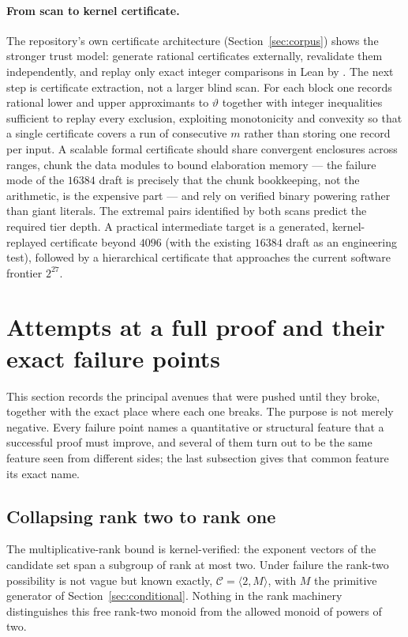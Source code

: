 \documentclass[11pt,oneside]{article}
\theoremstyle{definition}
\theoremstyle{remark}
\newcommand{\thetaq}{\vartheta}
\newcommand{\Cand}{\mathcal C}
\newcommand{\lean}[1]{\texttt{\detokenize{#1}}}
\begin{document}
\paragraph{From scan to kernel certificate.}
The repository's own certificate architecture (Section~\ref{sec:corpus}) shows the stronger
trust model: generate rational certificates externally, revalidate them independently, and
replay only exact integer comparisons in Lean by \lean{decide}.  The next step is certificate
extraction, not a larger blind scan.  For each block one records rational lower and upper
approximants to $\thetaq$ together with integer inequalities sufficient to replay every
exclusion, exploiting monotonicity and convexity so that a single certificate covers a run of
consecutive $m$ rather than storing one record per input.  A scalable formal certificate
should share convergent enclosures across ranges, chunk the data modules to bound elaboration
memory --- the failure mode of the $16384$ draft is precisely that the chunk bookkeeping, not
the arithmetic, is the expensive part --- and rely on verified binary powering rather than
giant literals.  The extremal pairs identified by both scans predict the required tier depth.
A practical intermediate target is a generated, kernel-replayed certificate beyond $4096$
(with the existing $16384$ draft as an engineering test), followed by a hierarchical
certificate that approaches the current software frontier $2^{27}$.
\section{Attempts at a full proof and their exact failure points}
\label{sec:attempts}

This section records the principal avenues that were pushed until they broke, together with
the exact place where each one breaks.  The purpose is not merely negative.  Every failure
point names a quantitative or structural feature that a successful proof must improve, and
several of them turn out to be the same feature seen from different sides; the last
subsection gives that common feature its exact name.

\subsection{Collapsing rank two to rank one}
\label{at:rank}

The multiplicative-rank bound is kernel-verified: the exponent vectors of the candidate set
span a subgroup of rank at most two.  Under failure the rank-two possibility is not vague
but known exactly, $\Cand=\langle2,M\rangle$, with $M$ the primitive generator of
Section~\ref{sec:conditional}.  Nothing in the rank machinery distinguishes this free
rank-two monoid from the allowed monoid of powers of two.
\end{document}
